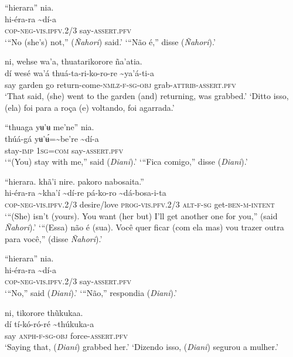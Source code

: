 \documentclass[output=paper,
modfonts,nonflat
]{langsci/langscibook}
\begin{document}
\ea “hierara” nia. \\[.3em]
\gll hi-éra-ra	{\textasciitilde}dí-a \\
     \textsc{cop-neg-vis.ipfv.}2/3	say-\textsc{assert.pfv} \\
\glt ‘“No (she's) not,” (\textit{Ñahori}) said.’
\glt ‘“Não é,” disse (\textit{Ñahori}).’
\z 

\ea ni, wehse wa'a, thuatarikorore ña'atia.  \\[.3em]
\gll {\textasciitilde}dí	wesé	wa'á	thuá-ta-ri-ko-ro-re	{\textasciitilde}ya'á-ti-a \\
     say	garden	go	return-come-\textsc{nmlz-f-sg-obj}	grab-\textsc{attrib-assert.pfv} \\
\glt ‘That said, (she) went to the garden (and) returning, was grabbed.’ 
\glt ‘Ditto isso, (ela) foi para a roça (e) voltando, foi agarrada.’
\z 

\ea “thuaga yʉ’ʉ me'ne” nia. \\[.3em]
\gll thúá-gá	yʉ’ʉ́={\textasciitilde}be're	{\textasciitilde}dí-a \\
     stay-\textsc{imp}	1\textsc{sg=com}	say-\textsc{assert.pfv} \\
\glt ‘“(You) stay with me,” said (\textit{Diani}).’
\glt ‘“Fica comigo,” disse (\textit{Diani}).’
\z 

\ea “hierara. khã'i nire. pakoro nabosaita.”  \\[.3em]
\gll hi-éra-ra	{\textasciitilde}kha'í	{\textasciitilde}dí-re pá-ko-ro	{\textasciitilde}dá-bosa-i-ta \\
     \textsc{cop-neg-vis.ipfv.}2/3	desire/love	\textsc{prog-vis.pfv.}2/3 \textsc{alt-f-sg}	get\textsc{-ben-m-intent}\\
\glt ‘“(She) isn’t (yours). You want (her but) I'll get another one for you,” (said \textit{Ñahori}).’
\newpage
\glt ‘“(Essa) não é (sua). Você quer ficar (com ela mas) vou trazer outra para você,” (disse \textit{Ñahori}).’
\z 

\ea “hierara” nia. \\[.3em]
\gll hi-éra-ra	{\textasciitilde}dí-a \\
     \textsc{cop-neg-vis.ipfv.}2/3	say-\textsc{assert.pfv} \\
\glt ‘“No,” said (\textit{Diani}).’ 
\glt ‘“Não,” respondia (\textit{Diani}).’
\z 

\ea ni, tikorore thũkukaa.  \\[.3em]
\gll {\textasciitilde}dí	tí-kó-ró-ré	{\textasciitilde}thúkuka-a \\
     say	\textsc{anph-f-sg-obj}	force-\textsc{assert.pfv} \\
\glt ‘Saying that, (\textit{Diani}) grabbed her.’ 
\glt ‘Dizendo isso, (\textit{Diani}) segurou a mulher.’
\z 
\end{document}
